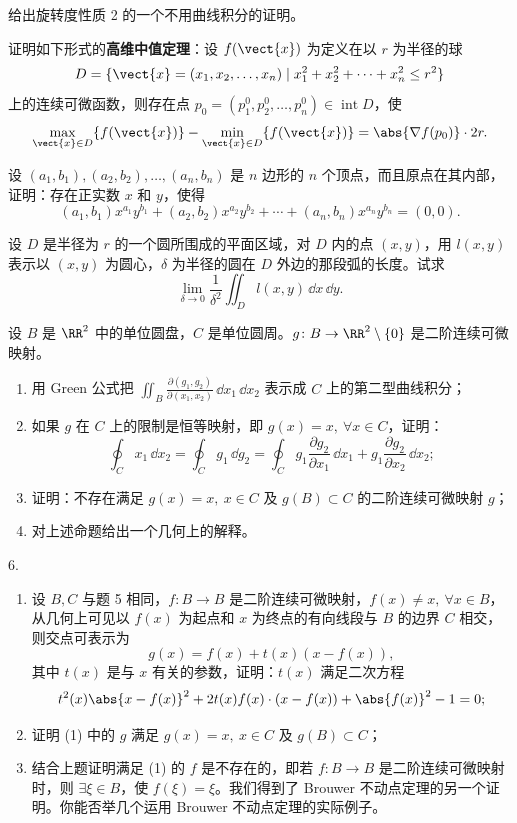 \begin{xreferenceproblem}[1]
给出旋转度性质 2 的一个不用曲线积分的证明。
\end{xreferenceproblem}\begin{xreferenceproblem}[2]
证明如下形式的\textbf{高维中值定理}：设 $f(\vect{x})$ 为定义在以 $r$ 为半径的球
\[
  D=\{\vect{x}=(x_1,x_2,\ldots,x_n)\mid x_1^2+x_2^2+\cdots+x_n^2\le r^2\}
\]
上的连续可微函数，则存在点 $p_0=(p_1^0,p_2^0,\ldots,p_n^0)\in\operatorname{int}D$，使
\[
  \max_{\vect{x}\in D}\{f(\vect{x})\}-\min_{\vect{x}\in D}\{f(\vect{x})\}=\abs{\nabla f(p_0)}\cdot2r.
\]
\end{xreferenceproblem}\begin{xreferenceproblem}[3]
设 $(a_1,b_1),(a_2,b_2),\ldots,(a_n,b_n)$ 是 $n$ 边形的 $n$ 个顶点，而且原点在其内部，证明：存在正实数 $x$ 和 $y$，使得
\[
  (a_1,b_1)x^{a_1}y^{b_1}+(a_2,b_2)x^{a_2}y^{b_2}+\cdots+(a_n,b_n)x^{a_n}y^{b_n}=(0,0).
\]
\end{xreferenceproblem}\begin{xreferenceproblem}[4]
设 $D$ 是半径为 $r$ 的一个圆所围成的平面区域，对 $D$ 内的点 $(x,y)$，用 $l(x,y)$ 表示以 $(x,y)$ 为圆心，$\delta$ 为半径的圆在 $D$ 外边的那段弧的长度。试求
\[
  \lim_{\delta\to0}\frac1{\delta^2}\iint_Dl(x,y)\,\dd x\,\dd y.
\]
\end{xreferenceproblem}\begin{xreferenceproblem}[5]
设 $B$ 是 $\RR^2$ 中的单位圆盘，$C$ 是单位圆周。$g\colon B\to\RR^2\setminus\{0\}$ 是二阶连续可微映射。
\begin{enumerate}[label=(\arabic*)]
  \item 用 Green 公式把 $\displaystyle\iint_B\frac{\partial(g_1,g_2)}{\partial(x_1,x_2)}\,\dd x_1\,\dd x_2$ 表示成 $C$ 上的第二型曲线积分；
  \item 如果 $g$ 在 $C$ 上的限制是恒等映射，即 $g(x)=x,\ \forall x\in C$，证明：
  \[
    \oint_Cx_1\,\dd x_2=\oint_Cg_1\,\dd g_2
    =\oint_Cg_1\frac{\partial g_2}{\partial x_1}\,\dd x_1+g_1\frac{\partial g_2}{\partial x_2}\,\dd x_2;
  \]
  \item 证明：不存在满足 $g(x)=x,\ x\in C$ 及 $g(B)\subset C$ 的二阶连续可微映射 $g$；
  \item 对上述命题给出一个几何上的解释。
\end{enumerate}

6.
\begin{enumerate}[label=(\arabic*)]
  \item 设 $B,C$ 与题 5 相同，$f\colon B\to B$ 是二阶连续可微映射，$f(x)\ne x,\ \forall x\in B$，从几何上可见以 $f(x)$ 为起点和 $x$ 为终点的有向线段与 $B$ 的边界 $C$ 相交，则交点可表示为
  \[
    g(x)=f(x)+t(x)(x-f(x)),
  \]
  其中 $t(x)$ 是与 $x$ 有关的参数，证明：$t(x)$ 满足二次方程
  \[
    t^2(x)\abs{x-f(x)}^2+2t(x)f(x)\cdot(x-f(x))+\abs{f(x)}^2-1=0;
  \]
  \item 证明 (1) 中的 $g$ 满足 $g(x)=x,\ x\in C$ 及 $g(B)\subset C$；
  \item 结合上题证明满足 (1) 的 $f$ 是不存在的，即若 $f\colon B\to B$ 是二阶连续可微映射时，则 $\exists\xi\in B$，使 $f(\xi)=\xi$。我们得到了 Brouwer 不动点定理的另一个证明。你能否举几个运用 Brouwer 不动点定理的实际例子。
\end{enumerate}
\end{xreferenceproblem}
